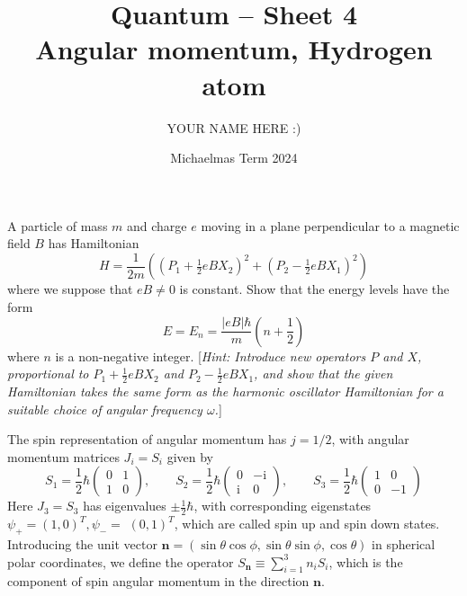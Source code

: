 \documentclass[answers]{exam}
\title{Quantum -- Sheet 4\\Angular momentum, Hydrogen atom}
\author{YOUR NAME HERE :)}
\date{Michaelmas Term 2024}
\begin{document}
\maketitle

\begin{questions}

\question%
A particle of mass $m$ and charge $e$ moving in a plane perpendicular to a magnetic field $B$ has Hamiltonian \[
	H=\frac{1}{2 m}\left((P_{1}+\tfrac{1}{2} e B X_{2})^{2}+(P_{2}-\tfrac{1}{2} e B X_{1})^{2}\right)
\] where we suppose that $e B \neq 0$ is constant. Show that the energy levels have the form \[
	E=E_{n}=\frac{|e B| \hbar}{m}\left(n+\frac{1}{2}\right)
\] where $n$ is a non-negative integer. [\emph{Hint: Introduce new operators $P$ and $X$, proportional to $P_{1}+\frac{1}{2} e B X_{2}$ and $P_{2}-\frac{1}{2} e B X_{1}$, and show that the given Hamiltonian takes the same form as the harmonic oscillator Hamiltonian for a suitable choice of angular frequency $\omega$.}]



\question%
The spin representation of angular momentum has $j=1 / 2$, with angular momentum matrices $J_{i}=S_{i}$ given by \[
	S_{1}=\frac{1}{2} \hbar\begin{pmatrix}
		0 & 1 \\
		1 & 0
	\end{pmatrix}, \qquad S_{2}=\frac{1}{2} \hbar\begin{pmatrix}
		0 & -\mathrm{i} \\
		\mathrm{i} & 0
	\end{pmatrix}, \qquad S_{3}=\frac{1}{2} \hbar\begin{pmatrix}
		1 & 0 \\
		0 & -1
	\end{pmatrix}
\] Here $J_{3}=S_{3}$ has eigenvalues $\pm \frac{1}{2} \hbar$, with corresponding eigenstates $\psi_{+}=(1,0)^{T}, \psi_{-}=$ $(0,1)^{T}$, which are called spin up and spin down states. Introducing the unit vector $\mathbf{n}=(\sin \theta \cos \phi, \sin \theta \sin \phi, \cos \theta)$ in spherical polar coordinates, we define the operator $S_{\mathbf{n}} \equiv \sum_{i=1}^{3} n_{i} S_{i}$, which is the component of spin angular momentum in the direction $\mathbf{n}$.
\end{questions}
\end{document}

